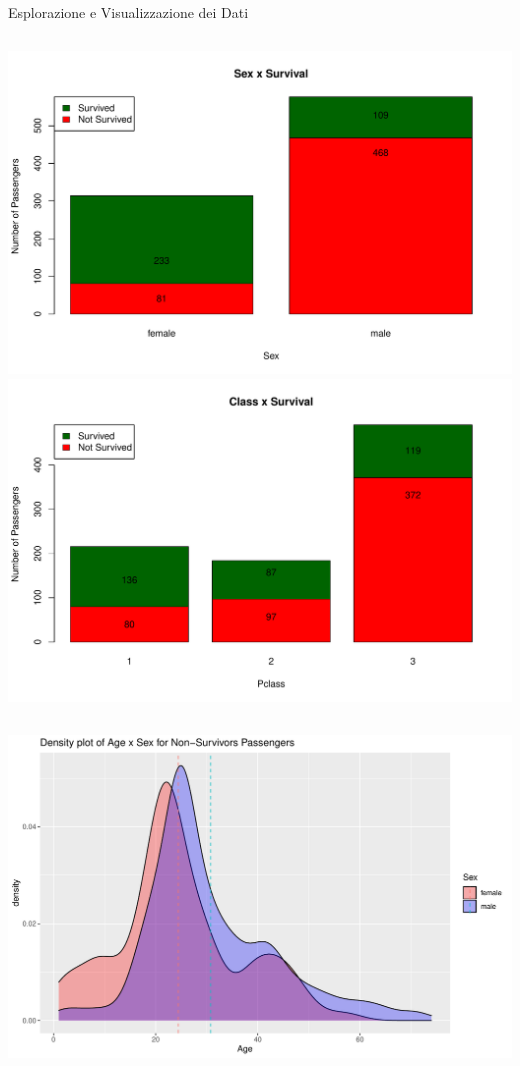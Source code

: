 \documentclass[9pt, xcolor=table]{beamer}
\begin{document}
	\begin{frame}{Esplorazione e Visualizzazione dei Dati}
		\begin{columns}
			\centering
			\includegraphics[scale=0.26]{barplot-sex-survival}
			\centering
			\includegraphics[scale=0.26]{barplot-class-survival}
		\end{columns}
		\begin{columns}
			\column{0.5\textwidth}
			\centering
			\includegraphics[scale=0.26]{density-age-sex-notsurvived}

\end{columns}
\end{frame}
\end{document}
